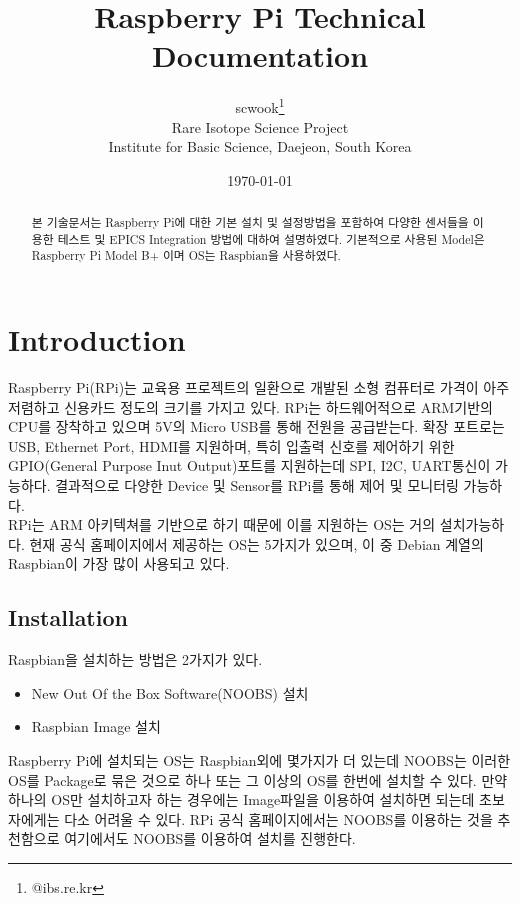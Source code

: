 \documentclass[11pt
  , a4paper
  , article
  , oneside
]{memoir}
\begin{document}
\newcommand{\technumber}{
  RAON Control-Document Series\\
  Revision : v1.0,   Release : a fixed date}
\title{\textbf{Raspberry Pi Technical Documentation}}

\author{scwook\thanks{@ibs.re.kr} \\

  Rare Isotope Science Project\\
  Institute for Basic Science, Daejeon, South Korea
}
\date{\today}

\renewcommand{\maketitlehooka}{\begin{flushright}\textsf{\technumber}\end{flushright}}

\maketitle

\begin{abstract}
본 기술문서는 Raspberry Pi에 대한 기본 설치 및 설정방법을 포함하여 다양한 센서들을 이용한 테스트 및 
EPICS Integration 방법에 대하여 설명하였다. 기본적으로 사용된 Model은 Raspberry Pi Model B+ 이며  
OS는 Raspbian을 사용하였다. \citep{FAI}
\end{abstract}

\chapter{Introduction}
Raspberry Pi(RPi)는 교육용 프로젝트의 일환으로 개발된 소형 컴퓨터로 가격이 아주 저렴하고 신용카드 정도의
크기를 가지고 있다. RPi는 하드웨어적으로 ARM기반의 CPU를 장착하고 있으며 5V의 Micro USB를 통해 전원을 
공급받는다. 확장 포트로는 USB, Ethernet Port, HDMI를 지원하며, 특히 입출력 신호를 제어하기 위한 
GPIO(General Purpose Inut Output)포트를 지원하는데 SPI, I2C, UART통신이 가능하다. 결과적으로 다양한
Device 및 Sensor를 RPi를 통해 제어 및 모니터링 가능하다.\\

RPi는 ARM 아키텍쳐를 기반으로 하기 때문에 이를 지원하는 OS는 거의 설치가능하다. 현재 공식 홈페이지에서
제공하는 OS는 5가지가 있으며, 이 중 Debian 계열의 Raspbian이 가장 많이 사용되고 있다.

\section{Installation}
Raspbian을 설치하는 방법은 2가지가 있다.
\begin{itemize}
\item New Out Of the Box Software(NOOBS) 설치
\item Raspbian Image 설치
\end{itemize}
Raspberry Pi에 설치되는 OS는 Raspbian외에 몇가지가 더 있는데 NOOBS는 이러한 OS를 Package로 묶은 것으로 
하나 또는 그 이상의 OS를 한번에 설치할 수 있다. 만약 하나의 OS만 설치하고자 하는 경우에는 Image파일을 
이용하여 설치하면 되는데 초보자에게는 다소 어려울 수 있다. RPi 공식 홈페이지에서는 NOOBS를 이용하는 것을 추천함으로 여기에서도 NOOBS를 이용하여 설치를 진행한다.
\end{document}
